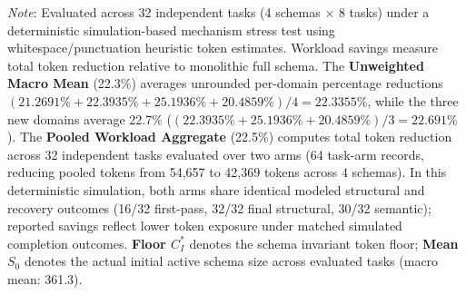 \begin{table}[t]
\begin{minipage}{\textwidth}
\textit{Note}: Evaluated across 32 independent tasks (4 schemas $\times$ 8 tasks) under a deterministic simulation-based mechanism stress test using whitespace/punctuation heuristic token estimates. Workload savings measure total token reduction relative to monolithic full schema. The \textbf{Unweighted Macro Mean} (22.3\%) averages unrounded per-domain percentage reductions $(21.2691\% + 22.3935\% + 25.1936\% + 20.4859\%) / 4 = 22.3355\%$, while the three new domains average 22.7\% ($(22.3935\% + 25.1936\% + 20.4859\%) / 3 = 22.691\%$). The \textbf{Pooled Workload Aggregate} (22.5\%) computes total token reduction across 32 independent tasks evaluated over two arms (64 task-arm records, reducing pooled tokens from 54,657 to 42,369 tokens across 4 schemas). In this deterministic simulation, both arms share identical modeled structural and recovery outcomes (16/32 first-pass, 32/32 final structural, 30/32 semantic); reported savings reflect lower token exposure under matched simulated completion outcomes. \textbf{Floor $C_I^*$} denotes the schema invariant token floor; \textbf{Mean $S_0$} denotes the actual initial active schema size across evaluated tasks (macro mean: 361.3).
\end{minipage}
\end{table}
